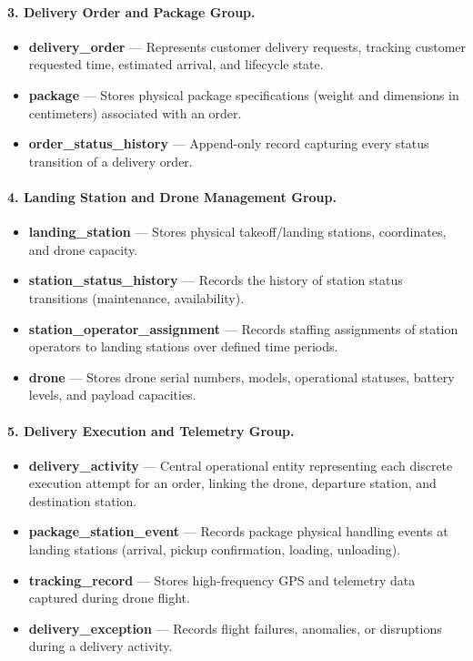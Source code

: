 \paragraph{3. Delivery Order and Package Group.}
\begin{itemize}
    \item \textbf{delivery\_order} — Represents customer delivery requests, tracking customer requested time, estimated arrival, and lifecycle state.
    \item \textbf{package} — Stores physical package specifications (weight and dimensions in centimeters) associated with an order.
    \item \textbf{order\_status\_history} — Append-only record capturing every status transition of a delivery order.
\end{itemize}

\paragraph{4. Landing Station and Drone Management Group.}
\begin{itemize}
    \item \textbf{landing\_station} — Stores physical takeoff/landing stations, coordinates, and drone capacity.
    \item \textbf{station\_status\_history} — Records the history of station status transitions (maintenance, availability).
    \item \textbf{station\_operator\_assignment} — Records staffing assignments of station operators to landing stations over defined time periods.
    \item \textbf{drone} — Stores drone serial numbers, models, operational statuses, battery levels, and payload capacities.
\end{itemize}

\paragraph{5. Delivery Execution and Telemetry Group.}
\begin{itemize}
    \item \textbf{delivery\_activity} — Central operational entity representing each discrete execution attempt for an order, linking the drone, departure station, and destination station.
    \item \textbf{package\_station\_event} — Records package physical handling events at landing stations (arrival, pickup confirmation, loading, unloading).
    \item \textbf{tracking\_record} — Stores high-frequency GPS and telemetry data captured during drone flight.
    \item \textbf{delivery\_exception} — Records flight failures, anomalies, or disruptions during a delivery activity.
\end{itemize}

